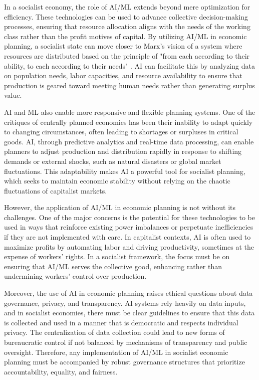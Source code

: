 \begin{refsection}
In a socialist economy, the role of AI/ML extends beyond mere optimization for efficiency. These technologies can be used to advance collective decision-making processes, ensuring that resource allocation aligns with the needs of the working class rather than the profit motives of capital. By utilizing AI/ML in economic planning, a socialist state can move closer to Marx's vision of a system where resources are distributed based on the principle of "from each according to their ability, to each according to their needs" \cite[pp.~245-248]{marx1977}. AI can facilitate this by analyzing data on population needs, labor capacities, and resource availability to ensure that production is geared toward meeting human needs rather than generating surplus value.

AI and ML also enable more responsive and flexible planning systems. One of the critiques of centrally planned economies has been their inability to adapt quickly to changing circumstances, often leading to shortages or surpluses in critical goods. AI, through predictive analytics and real-time data processing, can enable planners to adjust production and distribution rapidly in response to shifting demands or external shocks, such as natural disasters or global market fluctuations. This adaptability makes AI a powerful tool for socialist planning, which seeks to maintain economic stability without relying on the chaotic fluctuations of capitalist markets.

However, the application of AI/ML in economic planning is not without its challenges. One of the major concerns is the potential for these technologies to be used in ways that reinforce existing power imbalances or perpetuate inefficiencies if they are not implemented with care. In capitalist contexts, AI is often used to maximize profits by automating labor and driving productivity, sometimes at the expense of workers' rights. In a socialist framework, the focus must be on ensuring that AI/ML serves the collective good, enhancing rather than undermining workers' control over production.

Moreover, the use of AI in economic planning raises ethical questions about data governance, privacy, and transparency. AI systems rely heavily on data inputs, and in socialist economies, there must be clear guidelines to ensure that this data is collected and used in a manner that is democratic and respects individual privacy. The centralization of data collection could lead to new forms of bureaucratic control if not balanced by mechanisms of transparency and public oversight. Therefore, any implementation of AI/ML in socialist economic planning must be accompanied by robust governance structures that prioritize accountability, equality, and fairness.


\end{refsection}
